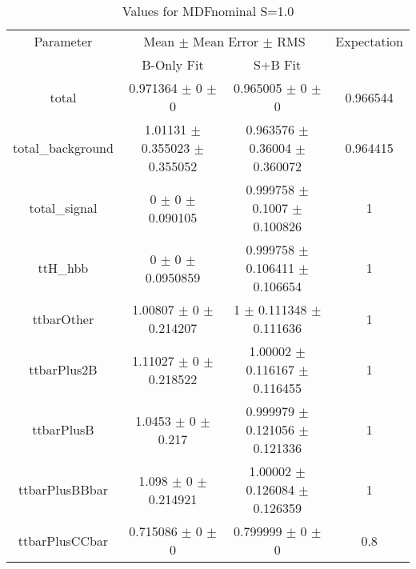 \begin{table}
\centering
\caption{Values for MDFnominal S=1.0}
\begin{tabular}{cccc}
\toprule
Parameter & \multicolumn{2}{c}{Mean $\pm$ Mean Error $\pm$ RMS} & Expectation\\
 & B-Only Fit & S+B Fit & \\
\midrule
total & \num{0.971364} $\pm$ \num{0} $\pm$ \num{0} & \num{0.965005} $\pm$ \num{0} $\pm$ \num{0} & \num{0.966544}\\
total\_background & \num{1.01131} $\pm$ \num{0.355023} $\pm$ \num{0.355052} & \num{0.963576} $\pm$ \num{0.36004} $\pm$ \num{0.360072} & \num{0.964415}\\
total\_signal & \num{0} $\pm$ \num{0} $\pm$ \num{0.090105} & \num{0.999758} $\pm$ \num{0.1007} $\pm$ \num{0.100826} & \num{1}\\
ttH\_hbb & \num{0} $\pm$ \num{0} $\pm$ \num{0.0950859} & \num{0.999758} $\pm$ \num{0.106411} $\pm$ \num{0.106654} & \num{1}\\
ttbarOther & \num{1.00807} $\pm$ \num{0} $\pm$ \num{0.214207} & \num{1} $\pm$ \num{0.111348} $\pm$ \num{0.111636} & \num{1}\\
ttbarPlus2B & \num{1.11027} $\pm$ \num{0} $\pm$ \num{0.218522} & \num{1.00002} $\pm$ \num{0.116167} $\pm$ \num{0.116455} & \num{1}\\
ttbarPlusB & \num{1.0453} $\pm$ \num{0} $\pm$ \num{0.217} & \num{0.999979} $\pm$ \num{0.121056} $\pm$ \num{0.121336} & \num{1}\\
ttbarPlusBBbar & \num{1.098} $\pm$ \num{0} $\pm$ \num{0.214921} & \num{1.00002} $\pm$ \num{0.126084} $\pm$ \num{0.126359} & \num{1}\\
ttbarPlusCCbar & \num{0.715086} $\pm$ \num{0} $\pm$ \num{0} & \num{0.799999} $\pm$ \num{0} $\pm$ \num{0} & \num{0.8}\\
\bottomrule
\end{tabular}
\end{table}